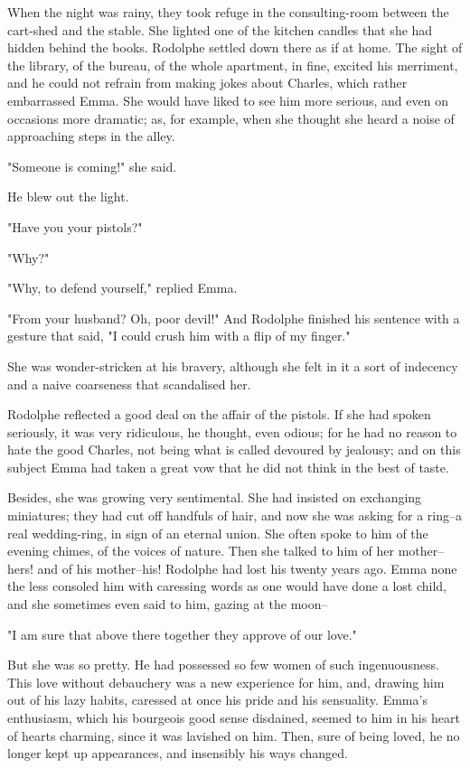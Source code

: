 \documentclass[11pt,twocolumn]{ltugboat}
\begin{document}
When the night was rainy, they took refuge in the consulting-room
between the cart-shed and the stable. She lighted one of the kitchen
candles that she had hidden behind the books. Rodolphe settled down
there as if at home. The sight of the library, of the bureau, of the
whole apartment, in fine, excited his merriment, and he could not
refrain from making jokes about Charles, which rather embarrassed Emma.
She would have liked to see him more serious, and even on occasions
more dramatic; as, for example, when she thought she heard a noise of
approaching steps in the alley.

"Someone is coming!" she said.

He blew out the light.

"Have you your pistols?"

"Why?"

"Why, to defend yourself," replied Emma.

"From your husband? Oh, poor devil!" And Rodolphe finished his sentence
with a gesture that said, "I could crush him with a flip of my finger."

She was wonder-stricken at his bravery, although she felt in it a sort
of indecency and a naive coarseness that scandalised her.

Rodolphe reflected a good deal on the affair of the pistols. If she had
spoken seriously, it was very ridiculous, he thought, even odious; for
he had no reason to hate the good Charles, not being what is called
devoured by jealousy; and on this subject Emma had taken a great vow
that he did not think in the best of taste.

Besides, she was growing very sentimental. She had insisted on
exchanging miniatures; they had cut off handfuls of hair, and now she
was asking for a ring--a real wedding-ring, in sign of an eternal union.
She often spoke to him of the evening chimes, of the voices of nature.
Then she talked to him of her mother--hers! and of his mother--his!
Rodolphe had lost his twenty years ago. Emma none the less consoled
him with caressing words as one would have done a lost child, and she
sometimes even said to him, gazing at the moon--

"I am sure that above there together they approve of our love."

But she was so pretty. He had possessed so few women of such
ingenuousness. This love without debauchery was a new experience for
him, and, drawing him out of his lazy habits, caressed at once his pride
and his sensuality. Emma's enthusiasm, which his bourgeois good sense
disdained, seemed to him in his heart of hearts charming, since it
was lavished on him. Then, sure of being loved, he no longer kept up
appearances, and insensibly his ways changed.
\end{document}
